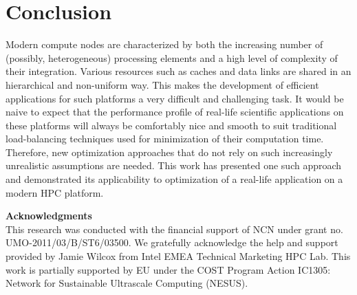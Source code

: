 \documentclass{acm_proc_article-sp}
\begin{document}
\section{Conclusion}
\label{sec:con}
Modern compute nodes are characterized by both the increasing number of (possibly, heterogeneous) processing elements and a high level of complexity of their integration. Various resources such as caches and data links are shared in an hierarchical and non-uniform way. This makes the development of efficient applications for such platforms a very difficult and challenging task. It would be naive to expect that the performance profile of real-life scientific applications on these platforms will always be comfortably nice and smooth to suit traditional load-balancing techniques used for minimization of their computation time. Therefore, new optimization approaches that do not rely on such increasingly unrealistic assumptions are needed.
This work has presented one such approach and demonstrated its applicability to optimization of a real-life application on a modern HPC platform.
 
\textbf{Acknowledgments} \\ This research was conducted with the financial support of NCN under grant no. UMO-2011/03/B/ST6/03500.
We gratefully acknowledge the help and support provided by Jamie Wilcox from Intel EMEA Technical Marketing HPC Lab.
This work is partially supported by EU under the COST Program Action IC1305: Network for Sustainable Ultrascale Computing (NESUS). 



\end{document}
